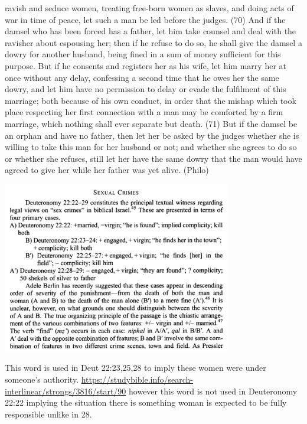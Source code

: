 \documentclass[11pt]{article}
\begin{document}
ravish and seduce women, treating free-born women as slaves, and doing acts of war in time of peace, let such a man be led before the judges. (70) And if the damsel who has been forced has a father, let him take counsel and deal with the ravisher about espousing her; then if he refuse to do so, he shall give the damsel a dowry for another husband, being fined in a sum of money sufficient for this purpose. But if he consents and registers her as his wife, let him marry her at once without any delay, confessing a second time that he owes her the same dowry, and let him have no permission to delay or evade the fulfilment of this marriage; both because of his own conduct, in order that the mishap which took place respecting her first connection with a man may be comforted by a firm marriage, which nothing shall ever separate but death. (71) But if the damsel be an orphan and have no father, then let her be asked by the judges whether she is willing to take this man for her husband or not; and whether she agrees to do so or whether she refuses, still let her have the same dowry that the man would have agreed to give her while her father was yet alive.
(Philo)

\includegraphics[width=10cm]{deuteronomy22_case_options}

This word is used in Deut 22:23,25,28 to imply these women were under someone’s authority. \url{https://studybible.info/search-interlinear/strongs/3816/start/90} however this word is not used in Deuteronomy 22:22 implying the situation there is something woman is expected to be fully responsible unlike in 28.
\end{document}
